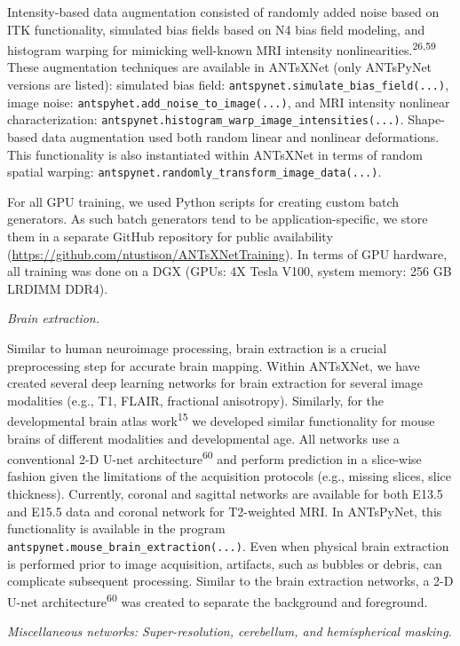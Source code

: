 \documentclass[
  12pt,
]{article}
\begin{document}
Intensity-based data augmentation consisted of randomly added noise
based on ITK functionality, simulated bias fields based on N4 bias field
modeling, and histogram warping for mimicking well-known MRI intensity
nonlinearities.\textsuperscript{26,59} These augmentation techniques are
available in ANTsXNet (only ANTsPyNet versions are listed): simulated
bias field: \texttt{antspynet.simulate\_bias\_field(...)}, image noise:
\texttt{antspyhet.add\_noise\_to\_image(...)}, and MRI intensity
nonlinear characterization:
\texttt{antspynet.histogram\_warp\_image\_intensities(...)}. Shape-based
data augmentation used both random linear and nonlinear deformations.
This functionality is also instantiated within ANTsXNet in terms of
random spatial warping:
\texttt{antspynet.randomly\_transform\_image\_data(...)}.

For all GPU training, we used Python scripts for creating custom batch
generators. As such batch generators tend to be application-specific, we
store them in a separate GitHub repository for public availability
(\url{https://github.com/ntustison/ANTsXNetTraining}). In terms of GPU
hardware, all training was done on a DGX (GPUs: 4X Tesla V100, system
memory: 256 GB LRDIMM DDR4).

\emph{Brain extraction.}

Similar to human neuroimage processing, brain extraction is a crucial
preprocessing step for accurate brain mapping. Within ANTsXNet, we have
created several deep learning networks for brain extraction for several
image modalities (e.g., T1, FLAIR, fractional anisotropy). Similarly,
for the developmental brain atlas work\textsuperscript{15} we developed
similar functionality for mouse brains of different modalities and
developmental age. All networks use a conventional 2-D U-net
architecture\textsuperscript{60} and perform prediction in a slice-wise
fashion given the limitations of the acquisition protocols (e.g.,
missing slices, slice thickness). Currently, coronal and sagittal
networks are available for both E13.5 and E15.5 data and coronal network
for T2-weighted MRI. In ANTsPyNet, this functionality is available in
the program \texttt{antspynet.mouse\_brain\_extraction(...)}. Even when
physical brain extraction is performed prior to image acquisition,
artifacts, such as bubbles or debris, can complicate subsequent
processing. Similar to the brain extraction networks, a 2-D U-net
architecture\textsuperscript{60} was created to separate the background
and foreground.

\emph{Miscellaneous networks: Super-resolution, cerebellum, and
hemispherical masking.}
\end{document}
